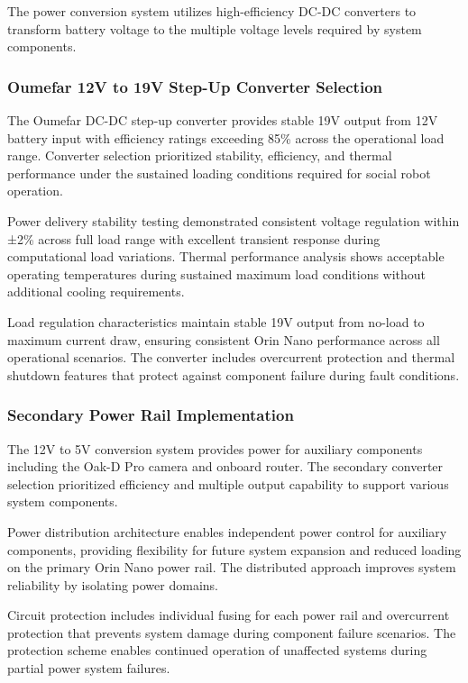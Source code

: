 The power conversion system utilizes high-efficiency DC-DC converters to transform battery voltage to the multiple voltage levels required by system components.

\subsubsection{Oumefar 12V to 19V Step-Up Converter Selection}

The Oumefar DC-DC step-up converter provides stable 19V output from 12V battery input with efficiency ratings exceeding 85\% across the operational load range. Converter selection prioritized stability, efficiency, and thermal performance under the sustained loading conditions required for social robot operation.

Power delivery stability testing demonstrated consistent voltage regulation within ±2\% across full load range with excellent transient response during computational load variations. Thermal performance analysis shows acceptable operating temperatures during sustained maximum load conditions without additional cooling requirements.

Load regulation characteristics maintain stable 19V output from no-load to maximum current draw, ensuring consistent Orin Nano performance across all operational scenarios. The converter includes overcurrent protection and thermal shutdown features that protect against component failure during fault conditions.

\subsubsection{Secondary Power Rail Implementation}

The 12V to 5V conversion system provides power for auxiliary components including the Oak-D Pro camera and onboard router. The secondary converter selection prioritized efficiency and multiple output capability to support various system components.

Power distribution architecture enables independent power control for auxiliary components, providing flexibility for future system expansion and reduced loading on the primary Orin Nano power rail. The distributed approach improves system reliability by isolating power domains.

Circuit protection includes individual fusing for each power rail and overcurrent protection that prevents system damage during component failure scenarios. The protection scheme enables continued operation of unaffected systems during partial power system failures.

